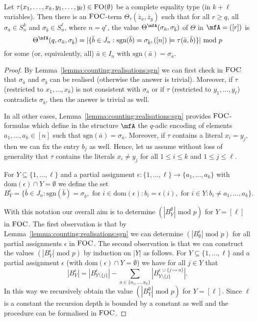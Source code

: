 \documentclass[a4paper,UKenglish]{lipics}
\newcommand{\inseg}[1]{\ensuremath{[#1]}}
\newcommand{\card}[1]{\ensuremath{|#1|}}
\newcommand{\sgn}{\ensuremath{\textrm{sgn}}}
\newcommand{\modulo}{\ensuremath{\text{mod }}}
\newcommand{\dom}{\ensuremath{\textrm{dom}}}
\newcommand{\logic}[1]{\ensuremath{\textsc{#1}}\xspace}
\newcommand{\FO}{\logic{FO}}
\newcommand{\FOC}{\logic{FOC}}
\newcommand{\ba}{{\bar a}}
\newcommand{\bb}{{\bar b}}
\newcommand{\bz}{{\bar z}}
\theoremstyle{plain}
\begin{document}
\begin{lemma}\label{lemma:entrymn:comp:type}
Let
$\tau(x_1, \dots, x_k, y_1, \dots, y_\ell)\in \FO(\emptyset)$ be a complete 
equality type (in $k + \ell$ variables).
Then there is an $\FOC$-term $\Theta_\tau(\bz_x,\bz_y)$ such that for all 
$r \geq q$, all $\sigma_{\ba} \in S_n^k$ and $\sigma_{\bb} \in 
S_n^\ell$, 
where $n = q ^r$, the value
$\Theta^\mfA(\sigma_{\ba}, \sigma_{\bb})$ of $\Theta$ in $\mfA =
(\inseg r)$ is 
\[\Theta^\mfA(q, \sigma_{\ba},
\sigma_{\bb})= \card{ \{ \bb \in J_n : \sgn(\bb) = \sigma_{\bb}, (\inseg 
n) \models
\tau(\ba,\bb) \}} \,\,\modulo p\]
for some (or, equivalently, all) $\ba \in I_n$ with $\sgn(\ba) = \sigma_{\ba}$.
\end{lemma}
\begin{proof}
 By Lemma~\ref{lemma:counting:realisations:sgn} we can first check in
$\FOC$ that $\sigma_{\ba}$ and $\sigma_{\bb}$ can be realised (otherwise the
answer is trivial). Moreover, if $\tau$ (restricted to $x_1, \dots, x_k$) is not
consistent with $\sigma_{\ba}$ or if $\tau$ (restricted to $y_1, \dots, y_\ell$)
contradicts $\sigma_{\bb}$, then the answer is trivial as well.

In all other cases, Lemma~\ref{lemma:counting:realisations:sgn} provides 
$\FOC$-formulas which define in the structure $\mfA$ the $q$-adic encoding 
of elements $a_1, \dots, a_k \in \inseg{n}$ such that $\sgn(\ba) = 
\sigma_{\ba}$. 
Moreover, if $\tau$ contains a literal $x_i = y_j$, then we can
fix the entry $b_j$ as well. Hence, let us assume without loss of 
generality that $\tau$ contains the literals $x_i \neq y_j$ for all 
$1 \leq i \leq k$ and $1 \leq j \leq \ell$.

For $Y \subseteq \{ 1, \dots, \ell \}$ and a partial assignment $\epsilon: \{1,
\dots, \ell \} \to \{ a_1, \dots, a_k \}$ with $\dom(\epsilon) \cap Y =
\emptyset$ we define the set 
\[ B_Y^\epsilon = \{ \bb \in J_n : \sgn(\bb) = \sigma_{\bb}, \text{ for } i \in
\dom(\epsilon): b_i = \epsilon(i), \text{ for } i \in Y: b_i \neq a_1,
\dots, a_k \}.  \] 

With this notation our overall aim is to determine $(\card{B_{Y }^\emptyset}
\,\,\modulo p)$ for $Y = \inseg \ell$ in $\FOC$. The first observation is
that by Lemma~\ref{lemma:counting:realisations:sgn} we can determine
$(\card{B_{\emptyset}^\epsilon} \,\,\modulo p)$ for all partial
assignments $\epsilon$ in $\FOC$.
The second observation is that we can construct the values
$(\card{B_{Y}^\epsilon} \,\,\modulo p)$ by induction on $\card{Y}$ as follows. 
For
$Y \subseteq \{1, \dots, \ell \}$ and a partial assignment $\epsilon$ (with
$\dom(\epsilon) \cap Y = \emptyset$) we have for all $j \in Y$ that
\[
\card{B_Y^\epsilon} = \card{B^\epsilon_{Y\setminus \{ j \}}} - 
\sum_{a \in \{a_1, \dots, a_k \}} 
\card{ B^{\epsilon \, \cup \{ j \mapsto a \} }_{Y\setminus \{ j \}} } .
\]
In this way we recursively obtain the value 
$(\card{B_{Y }^\emptyset} \,\,\modulo p)$ for $Y = \inseg \ell$. 
Since $\ell$ is a 
constant the recursion depth is bounded by a constant as well and the 
procedure can be formalised in $\FOC$. 
\end{proof}
\end{document}
